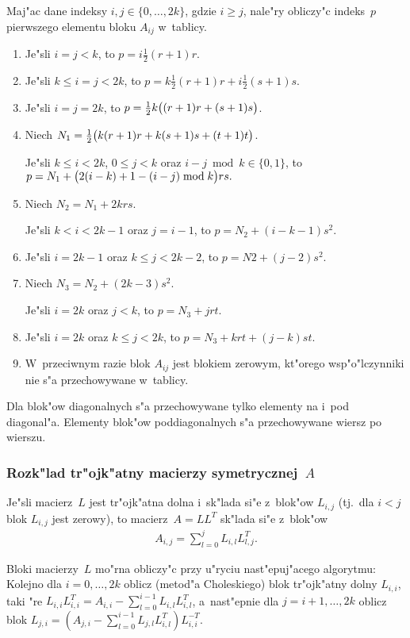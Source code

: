 Maj"ac dane indeksy $i,j\in\{0,\ldots,2k\}$, gdzie $i\geq j$, nale"ry
obliczy"c indeks~$p$ pierwszego elementu bloku $A_{ij}$ w~tablicy.
\begin{enumerate}
  \item Je"sli $i=j<k$, to $p=i\frac{1}{2}(r+1)r$.
  \item Je"sli $k\leq i=j<2k$, to $p=k\frac{1}{2}(r+1)r+i\frac{1}{2}(s+1)s$.
  \item Je"sli $i=j=2k$, to $p=\frac{1}{2}k\bigl((r+1)r+(s+1)s\bigr)$.
  \item Niech $N_1=\frac{1}{2}\bigl( k(r+1)r+k(s+1)s+(t+1)t\bigr)$.

    Je"sli $k\leq i<2k$, $0\leq j<k$ oraz $i-j\bmod k\in\{0,1\}$, to \\
    $p=N_1+\bigl( 2(i-k)+1-(i-j)\bmod k\bigr) rs.$
  \item Niech $N_2=N_1+2krs$.

    Je"sli $k<i<2k-1$ oraz $j=i-1$, to $p=N_2+(i-k-1)s^2$.
  \item Je"sli $i=2k-1$ oraz $k\leq j<2k-2$, to $p=N2+(j-2)s^2$.
  \item Niech $N_3=N_2+(2k-3)s^2$.

    Je"sli $i=2k$ oraz $j<k$, to $p=N_3+jrt$.
  \item Je"sli $i=2k$ oraz $k\leq j<2k$, to $p=N_3+krt+(j-k)st$.
  \item W~przeciwnym razie blok $A_{ij}$ jest blokiem zerowym, kt"orego
    wsp"o"lczynniki nie s"a przechowywane w~tablicy.
\end{enumerate}
Dla blok"ow diagonalnych s"a przechowywane tylko elementy na i~pod diagonal"a.
Elementy blok"ow poddiagonalnych s"a przechowywane wiersz po wierszu.


\subsubsection*{Rozk"lad tr"ojk"atny macierzy symetrycznej~$A$}

Je"sli macierz~$L$ jest tr"ojk"atna dolna i~sk"lada si"e
z~blok"ow $L_{i,j}$ (tj.\ dla $i<j$ blok $L_{i,j}$ jest zerowy),
to macierz~$A=LL^T$ sk"lada si"e z~blok"ow
\begin{align*}
  A_{i,j} = \sum_{l=0}^jL_{i,l}L_{l,j}^T.
\end{align*}

Bloki macierzy~$L$ mo"rna obliczy"c przy u"ryciu nast"epuj"acego algorytmu: \\
Kolejno dla $i=0,\ldots,2k$ oblicz (metod"a Choleskiego) blok tr"ojk"atny dolny
$L_{i,i}$, taki "re $L_{i,i}L_{i,i}^T=A_{i,i}-\sum_{l=0}^{i-1}L_{i,l}L_{i,l}^T$,
a~nast"epnie dla $j=i+1,\ldots,2k$ oblicz blok
$L_{j,i} = (A_{j,i}-\sum_{l=0}^{i-1}L_{j,l}L_{i,l}^T)L_{i,i}^{-T}$.

